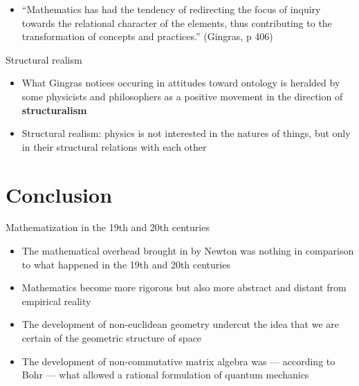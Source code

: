 \documentclass[fleqn]{beamer}
\newcommand{\kw}[1]{\textbf{#1}}
\begin{document}
\begin{frame}

  \begin{itemize}
  \item ``Mathematics has had the tendency of redirecting the focus of
    inquiry towards the relational character of the elements, thus
    contributing to the transformation of concepts and practices.''
    (Gingras, p 406)
  \end{itemize}

\end{frame}



\begin{frame}{Structural realism}

\begin{itemize}
  \item What Gingras notices occuring in attitudes toward ontology is
    heralded by some physicists and philosophers as a positive
    movement in the direction of \kw{structuralism}
  \item Structural realism: physics is not interested in the natures
    of things, but only in their structural relations with each other
  \end{itemize}
   
\end{frame}


\section{Conclusion}

\begin{frame}{Mathematization in the 19th and 20th centuries}

  \begin{itemize}
  \item The mathematical overhead brought in by Newton was nothing in
    comparison to what happened in the 19th and 20th centuries
  \item Mathematics become more rigorous but also more abstract and
    distant from empirical reality
  \item The development of non-euclidean geometry undercut the idea
    that we are certain of the geometric structure of space
  \item The development of non-commutative matrix algebra was ---
    according to Bohr --- what allowed a rational formulation of
    quantum mechanics
 \end{itemize}


\end{frame}
\end{document}
